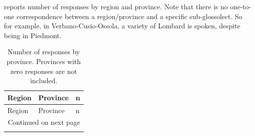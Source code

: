 \documentclass[a4paper,11pt]{article}
\begin{document}
 reports number of responses by region and province. Note that there is no one-to-one correspondence between a region/province and a specific sub-glossolect. So for example, in Verbano-Cusio-Ossola, a variety of Lombard is spoken, despite being in Piedmont.

\begin{longtable}{@{}lll@{}}
\caption{Number of responses by province. Provinces with zero responses are not included.}
\label{tab:resp-num}\\
\toprule
Region & Province & n \\ 
\midrule
\endfirsthead

\toprule
Region & Province & n \\ 
\midrule
\endhead

\midrule
\multicolumn{3}{r}{{Continued on next page}} \\ 
\midrule
\endfoot

\bottomrule
\endlastfoot


\end{longtable}
\end{document}
